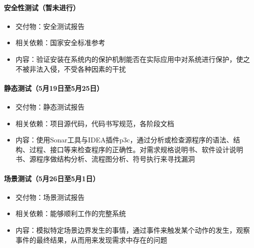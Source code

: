 \documentclass[hyperref, a4paper]{ctexart}
\providecommand{\tightlist}{%
  \setlength{\itemsep}{0pt}\setlength{\parskip}{0pt}}
\let\oldparagraph\paragraph
\renewcommand{\paragraph}[1]{\oldparagraph{#1}\mbox{}}
\begin{document}
\hypertarget{ux5b89ux5168ux6027ux6d4bux8bd5ux6682ux672aux8fdbux884c}{%
\paragraph{安全性测试（暂未进行）}\label{ux5b89ux5168ux6027ux6d4bux8bd5ux6682ux672aux8fdbux884c}}

\begin{itemize}
\tightlist
\item
  交付物：安全测试报告
\item
  相关依赖：国家安全标准参考
\item
  内容：验证安装在系统内的保护机制能否在实际应用中对系统进行保护，使之不被非法入侵，不受各种因素的干扰
\end{itemize}

\hypertarget{ux9759ux6001ux6d4bux8bd55ux670819ux65e5ux81f35ux670825ux65e5}{%
\paragraph{静态测试（5月19日至5月25日）}\label{ux9759ux6001ux6d4bux8bd55ux670819ux65e5ux81f35ux670825ux65e5}}

\begin{itemize}
\tightlist
\item
  交付物：静态测试报告
\item
  相关依赖：项目源代码，代码书写规范，各阶段文档
\item
  内容：使用Sonar工具与IDEA插件p3c，通过分析或检查源程序的语法、结构、过程、接口等来检查程序的正确性。对需求规格说明书、软件设计说明书、源程序做结构分析、流程图分析、符号执行来寻找漏洞
\end{itemize}

\hypertarget{ux573aux666fux6d4bux8bd55ux670826ux65e5ux81f35ux67081ux65e5}{%
\paragraph{场景测试（5月26日至5月1日）}\label{ux573aux666fux6d4bux8bd55ux670826ux65e5ux81f35ux67081ux65e5}}

\begin{itemize}
\tightlist
\item
  交付物：场景测试报告
\item
  相关依赖：能够顺利工作的完整系统
\item
  内容：模拟特定场景边界发生的事情，通过事件来触发某个动作的发生，观察事件的最终结果，从而用来发现需求中存在的问题
\end{itemize}
\end{document}
